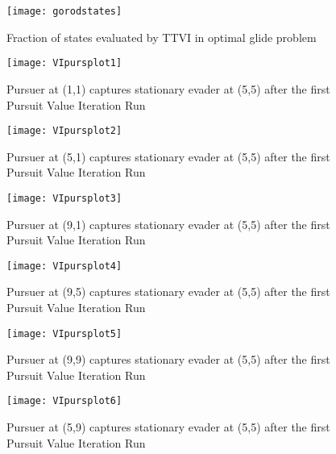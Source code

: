 \begin{figure}
\vspace{2.4in}
\centering
\texttt{[image: gorodstates]}
\caption{Fraction of states evaluated by TTVI in optimal glide problem \cite{gorod}}
\label{gorodstates}
\end{figure}
\clearpage
\newpage

\begin{figure}
\vspace{2.4in}
\centering
\texttt{[image: VIpursplot1]}
\caption{Pursuer at (1,1) captures stationary evader at (5,5) after the first Pursuit Value Iteration Run}
\label{VIpursplot1}
\end{figure}
\clearpage
\newpage

\begin{figure}
\vspace{2.4in}
\centering
\texttt{[image: VIpursplot2]}
\caption{Pursuer at (5,1) captures stationary evader at (5,5) after the first Pursuit Value Iteration Run}
\label{VIpursplot2}
\end{figure}
\clearpage
\newpage

\begin{figure}
\vspace{2.4in}
\centering
\texttt{[image: VIpursplot3]}
\caption{Pursuer at (9,1) captures stationary evader at (5,5) after the first Pursuit Value Iteration Run}
\label{VIpursplot3}
\end{figure}
\clearpage
\newpage

\begin{figure}
\vspace{2.4in}
\centering
\texttt{[image: VIpursplot4]}
\caption{Pursuer at (9,5) captures stationary evader at (5,5) after the first Pursuit Value Iteration Run}
\label{VIpursplot4}
\end{figure}
\clearpage
\newpage

\begin{figure}
\vspace{2.4in}
\centering
\texttt{[image: VIpursplot5]}
\caption{Pursuer at (9,9) captures stationary evader at (5,5) after the first Pursuit Value Iteration Run}
\label{VIpursplot5}
\end{figure}
\clearpage
\newpage

\begin{figure}
\vspace{2.4in}
\centering
\texttt{[image: VIpursplot6]}
\caption{Pursuer at (5,9) captures stationary evader at (5,5) after the first Pursuit Value Iteration Run}
\label{VIpursplot6}
\end{figure}
\clearpage
\newpage


